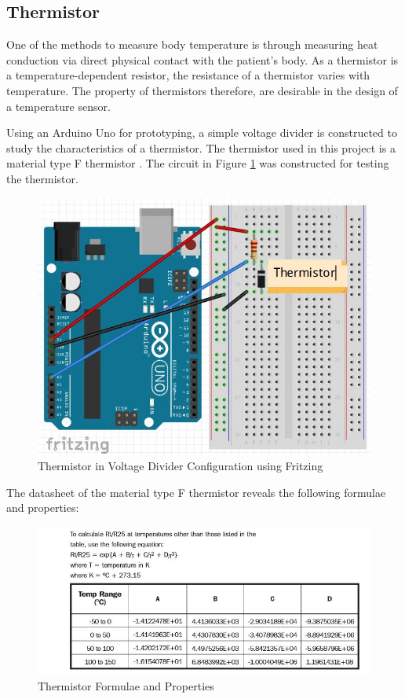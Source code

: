 \subsection{Thermistor}
\label{thermistor}

One of the methods to measure body temperature is through measuring heat conduction via direct physical contact with the patient's body. As a thermistor is a temperature-dependent resistor, the resistance of a thermistor varies with temperature. The property of thermistors therefore, are desirable in the design of a temperature sensor. 

Using an Arduino Uno for prototyping, a simple voltage divider is constructed to study the characteristics of a thermistor. The thermistor used in this project is a material type F thermistor \cite{thermistor}. The circuit in Figure \ref{temperaturefritzing1} was constructed for testing the thermistor. 

\begin{figure}[H]
	\centering
	\includegraphics[width=0.5\linewidth]{temperaturefritzing1.jpg}
	\caption{Thermistor in Voltage Divider Configuration using Fritzing}
	\label{temperaturefritzing1}
\end{figure}

The datasheet of the material type F thermistor \cite{thermistor} reveals the following formulae and properties: 

\begin{figure}[H]
	\centering
	\includegraphics[width=0.8\linewidth]{thermistordatasheet2.jpg}
	\caption{Thermistor Formulae and Properties \cite{thermistor}}
	\label{thermistordatasheet2}
\end{figure}

